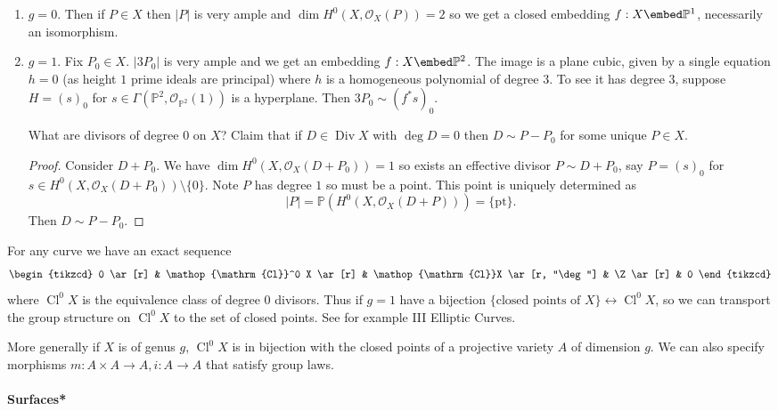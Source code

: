 \documentclass[a4paper]{article}
\renewcommand*{\P}{\mathbb{P}}
\newcommand{\sh}[1]{\mathcal{#1}} %
\DeclareMathOperator{\Div}{Div} %
\DeclareMathOperator{\Cl}{Cl} %
\begin{document}
\begin{eg}\leavevmode
  \begin{enumerate}
  \item \(g = 0\). Then if \(P \in X\) then \(|P|\) is very ample and \(\dim H^0(X, \sh O_X(P)) = 2\) so we get a closed embedding \(f: X \embed \P^1\), necessarily an isomorphism.
  \item \(g = 1\). Fix \(P_0 \in X\). \(|3P_0|\) is very ample and we get an embedding \(f: X \embed \P^2\). The image is a plane cubic, given by a single equation \(h = 0\) (as height \(1\) prime ideals are principal) where \(h\) is a homogeneous polynomial of degree \(3\). To see it has degree \(3\), suppose \(H = (s)_0\) for \(s \in \Gamma(\P^2, \sh O_{\P^2}(1))\) is a hyperplane. Then \(3P_0 \sim (f^* s)_0\).

    What are divisors of degree \(0\) on \(X\)? Claim that if \(D \in \Div X\) with \(\deg D = 0\) then \(D \sim P - P_0\) for some unique \(P \in X\).

    \begin{proof}
      Consider \(D + P_0\). We have \(\dim H^0(X, \sh O_X(D + P_0)) = 1\) so exists an effective divisor \(P \sim D + P_0\), say \(P = (s)_0\) for \(s \in H^0(X, \sh O_X(D + P_0)) \setminus \{0\}\). Note \(P\) has degree \(1\) so must be a point. This point is uniquely determined as
      \[
        |P| = \P(H^0(X, \sh O_X(D + P))) = \{\mathrm{pt}\}.
      \]
      Then \(D \sim P - P_0\).
    \end{proof}
  \end{enumerate}
\end{eg}

For any curve we have an exact sequence
\[
  \begin{tikzcd}
    0 \ar[r] & \Cl^0 X \ar[r] & \Cl X \ar[r, "\deg"] & \Z \ar[r] & 0
  \end{tikzcd}
\]
where \(\Cl^0 X\) is the equivalence class of degree \(0\) divisors. Thus if \(g = 1\) have a bijection \(\{\text{closed points of } X\} \leftrightarrow \Cl^0 X\), so we can transport the group structure on \(\Cl^0 X\) to the set of closed points. See for example III Elliptic Curves.

More generally if \(X\) is of genus \(g\), \(\Cl^0 X\) is in bijection with the closed points of a projective variety \(A\) of dimension \(g\). We can also specify morphisms \(m: A \times A \to A, i: A \to A\) that satisfy group laws.

\paragraph{Surfaces*}
\end{document}
